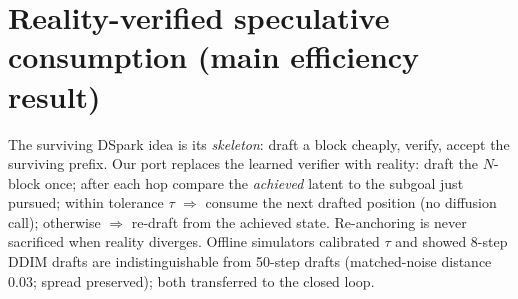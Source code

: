 \documentclass[11pt]{article}
\begin{document}
\section{Reality-verified speculative consumption (main efficiency result)}

The surviving DSpark idea is its \emph{skeleton}: draft a block cheaply, verify,
accept the surviving prefix. Our port replaces the learned verifier with reality:
draft the $N$-block once; after each hop compare the \emph{achieved} latent to the
subgoal just pursued; within tolerance $\tau$ $\Rightarrow$ consume the next drafted
position (no diffusion call); otherwise $\Rightarrow$ re-draft from the achieved
state. Re-anchoring is never sacrificed when reality diverges. Offline simulators
calibrated $\tau$ and showed 8-step DDIM drafts are indistinguishable from 50-step
drafts (matched-noise distance $0.03$; spread preserved); both transferred to the
closed loop.
\end{document}
